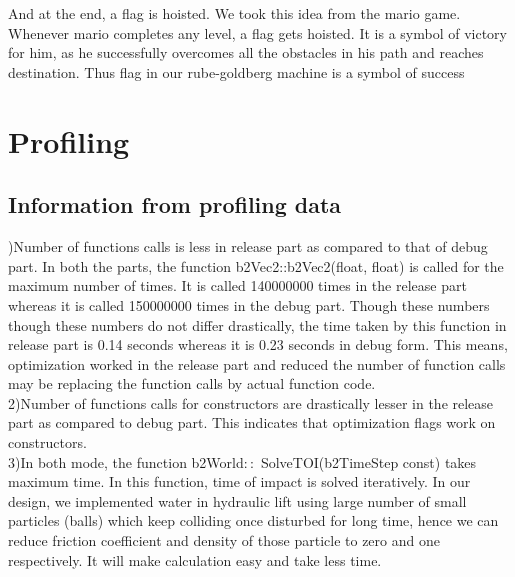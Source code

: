 \documentclass[a4paper,11pt]{article}
\begin{document}
{\\ \\
\indent And at the end, a flag is hoisted. We took this idea from the mario game. Whenever mario completes any level, a flag gets hoisted. It is a symbol of victory for him, as he successfully overcomes all the obstacles in his path and reaches destination. Thus flag in our rube-goldberg machine is a symbol of success
}

\newpage
\section{Profiling}
{
\subsection{Information from profiling data}
{

\indent {})Number of functions calls is less in release part as compared to that of debug part. In both the parts, the function b2Vec2::b2Vec2(float, float) is called for the maximum number of times. It is called 140000000 times in the release part whereas it is called 150000000 times in the debug part. Though these numbers though these numbers do not differ drastically, the time taken by this function in release part is 0.14 seconds whereas it is 0.23 seconds in debug form. This means, optimization worked in the release part and reduced the number of function calls may be replacing the function calls by actual function code. \\

2)Number of functions calls for constructors are drastically lesser in the release part as compared to debug part. This indicates that optimization flags work on constructors. \\

3)In both mode, the function b2World$::$ SolveTOI(b2TimeStep const) takes maximum time. In this function, time of impact is solved iteratively. In our design, we implemented water in hydraulic lift using large number of small particles (balls) which keep colliding once disturbed for long time, hence we can reduce friction coefficient and density of those particle to zero and one respectively. It will make calculation easy and take less time.

}}
\end{document}
